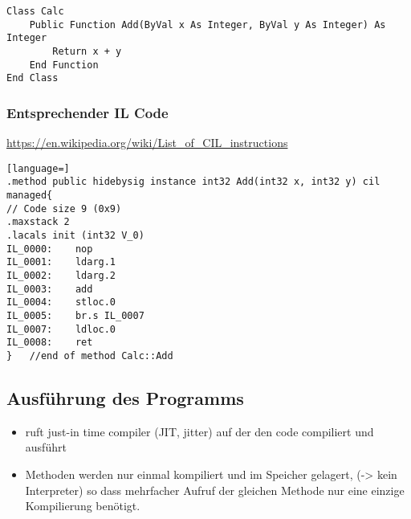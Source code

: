 \begin{lstlisting}[language={[Visual]Basic}]
Class Calc
	Public Function Add(ByVal x As Integer, ByVal y As Integer) As Integer
		Return x + y
	End Function
End Class
\end{lstlisting}


\subsubsection{Entsprechender IL Code}

\url{https://en.wikipedia.org/wiki/List_of_CIL_instructions}

\begin{lstlisting}[language=]
.method public hidebysig instance int32 Add(int32 x, int32 y) cil managed{
// Code size 9 (0x9)
.maxstack 2
.lacals init (int32 V_0)
IL_0000:	nop
IL_0001:	ldarg.1
IL_0002:	ldarg.2
IL_0003:	add
IL_0004:	stloc.0
IL_0005:	br.s IL_0007
IL_0007:	ldloc.0
IL_0008:	ret
}	//end of method Calc::Add
\end{lstlisting}


\subsection{Ausführung des Programms}

\begin{itemize}
\item ruft just-in time compiler (JIT, jitter) auf der den code compiliert und ausführt
\item Methoden werden nur einmal kompiliert und im Speicher gelagert, (-{\textgreater} kein Interpreter) so dass mehrfacher Aufruf der gleichen Methode nur eine einzige Kompilierung benötigt. 
\end{itemize}
~

